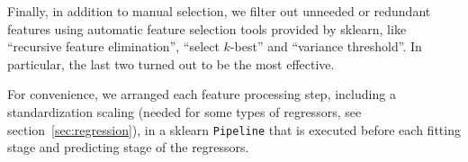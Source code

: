 Finally, in addition to manual selection, we filter out unneeded or redundant features using automatic feature selection tools provided by sklearn, like ``recursive feature elimination'', ``select $k$-best'' and ``variance threshold''. In particular, the last two turned out to be the most effective.

For convenience, we arranged each feature processing step, including a standardization scaling (needed for some types of regressors, see section~\ref{sec:regression}), in a sklearn \texttt{Pipeline} that is executed before each fitting stage and predicting stage of the regressors.
